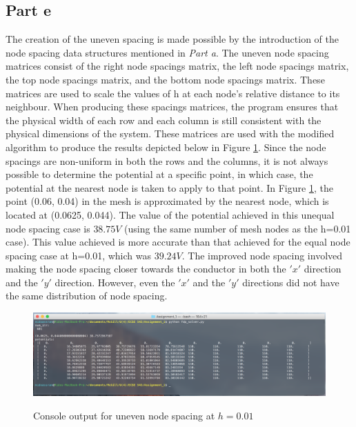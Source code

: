 \documentclass[11pt]{amsart}
\begin{document}
\subsection*{Part e}
The creation of the uneven spacing is made possible by the introduction of the node spacing data structures mentioned in \textit{Part a}. The uneven node spacing matrices consist of the right node spacings matrix, the left node spacings matrix, the top node spacings matrix, and the bottom node spacings matrix. These matrices are used to scale the values of h at each node's relative distance to its neighbour. When producing these spacings matrices, the program ensures that the physical width of each row and each column is still consistent with the physical dimensions of the system. These matrices are used with the modified algorithm to produce the results depicted below in Figure \ref{fig:uneven_spacing}. Since the node spacings are non-uniform in both the rows and the columns, it is not always possible to determine the potential at a specific point, in which case, the potential at the nearest node is taken to apply to that point. In Figure \ref{fig:uneven_spacing}, the point (0.06, 0.04) in the mesh is approximated by the nearest node, which is located at (0.0625, 0.044). The value of the potential achieved in this unequal node spacing case is $38.75V$ (using the same number of mesh nodes as the h=0.01 case). This value achieved is more accurate than that achieved for the equal node spacing case at h=0.01, which was $39.24V$. The improved node spacing involved making the node spacing closer towards the conductor in both the $'x'$ direction and the $'y'$ direction. However, even the $'x'$ and the $'y'$ directions did not have the same distribution of node spacing.

\begin{center}
	\begin{figure}[h]
		\caption{Console output for uneven node spacing at $h=0.01$}
		\includegraphics[width=\textwidth]{assets/uneven_spacing.png}\label{fig:uneven_spacing}
	\end{figure}
\end{center}
\end{document}
